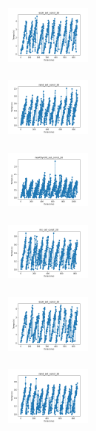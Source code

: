 \begin{figure}[H]
\begin{subfigure}
        \centering
        \includegraphics[width=0.234\textwidth]{img/bmb/ecoli_set_const_20_589741062_time.png}
    \end{subfigure}
    \hfill
    \begin{subfigure}
        \centering
        \includegraphics[width=0.234\textwidth]{img/bmb/rand_set_const_20_589741062_time.png}
    \end{subfigure}
    \hfill
    \begin{subfigure}
        \centering
        \includegraphics[width=0.234\textwidth]{img/bmb/newthyroid_set_const_20_589741062_time.png}
    \end{subfigure}
    \hfill
    \begin{subfigure}
        \centering
        \includegraphics[width=0.234\textwidth]{img/bmb/iris_set_const_20_277451237_time.png}
    \end{subfigure}
    \hfill
    \begin{subfigure}
        \centering
        \includegraphics[width=0.234\textwidth]{img/bmb/ecoli_set_const_20_277451237_time.png}
    \end{subfigure}
    \hfill
    \begin{subfigure}
        \centering
        \includegraphics[width=0.234\textwidth]{img/bmb/rand_set_const_20_277451237_time.png}

\end{subfigure}
\end{figure}
